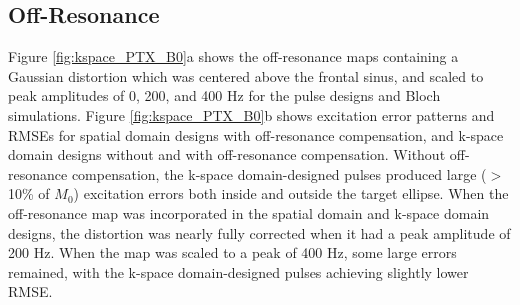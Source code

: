 \subsection*{Off-Resonance}
Figure \ref{fig:kspace_PTX_B0}a shows the off-resonance maps containing a Gaussian distortion which was centered above the frontal sinus,
and scaled to peak amplitudes of 0, 200, and 400 Hz for the pulse designs and Bloch simulations. 
Figure \ref{fig:kspace_PTX_B0}b shows excitation error patterns and RMSEs for spatial domain designs with off-resonance compensation,
and k-space domain designs without and with off-resonance compensation. 
Without off-resonance compensation, 
the k-space domain-designed pulses produced large ($>$ 10\% of $M_0$) excitation errors both inside and outside the target ellipse. 
When the off-resonance map was incorporated in the spatial domain and k-space domain designs, 
the distortion was nearly fully corrected when it had a peak amplitude of 200 Hz. 
When the map was scaled to a peak of 400 Hz, some large errors remained, with the k-space domain-designed pulses achieving slightly lower RMSE. 
